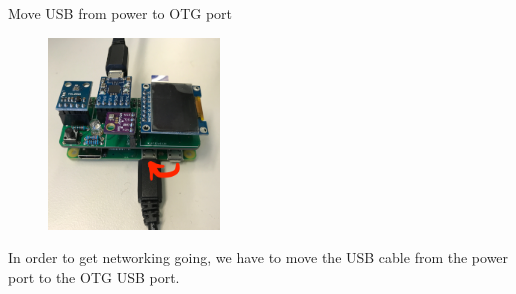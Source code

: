 \begin{frame}
   {Move USB from power to OTG port}
   \begin{figure}[H]
      \centering
      \includegraphics[height=2in]{IMAGES/rpi0wh-otg}
   \end{figure}

   In order to get networking going, we have to move the USB cable from the
   power port to the OTG USB port.
\end{frame}

\cprotect\note{


}

